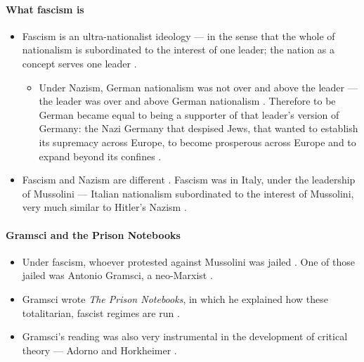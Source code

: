 \paragraph{What fascism is}
\begin{itemize}
    \item Fascism is an ultra-nationalist ideology --- in the sense that the whole of nationalism is subordinated to the interest of one leader; the nation as a concept serves one leader .
    \begin{itemize}
        \item Under Nazism, German nationalism was not over and above the leader --- the leader was over and above German nationalism . Therefore to be German became equal to being a supporter of that leader's version of Germany: the Nazi Germany that despised Jews, that wanted to establish its supremacy across Europe, to become prosperous across Europe and to expand beyond its confines .
    \end{itemize}
    \item Fascism and Nazism are different . Fascism was in Italy, under the leadership of Mussolini --- Italian nationalism subordinated to the interest of Mussolini, very much similar to Hitler's Nazism .
\end{itemize}

\paragraph{Gramsci and the Prison Notebooks}
\begin{itemize}
    \item Under fascism, whoever protested against Mussolini was jailed . One of those jailed was Antonio Gramsci, a neo-Marxist .
    \item Gramsci wrote \emph{The Prison Notebooks}, in which he explained how these totalitarian, fascist regimes are run .
    \item Gramsci's reading was also very instrumental in the development of critical theory --- Adorno and Horkheimer .
\end{itemize}

